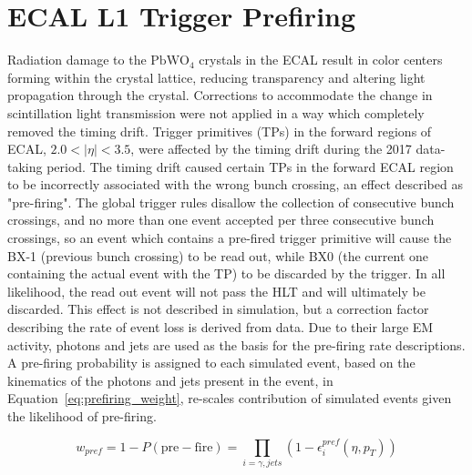 \section{ECAL L1 Trigger Prefiring}\label{ch:prefire}
Radiation damage to the $\mathrm{PbWO_4}$ crystals in the ECAL result in color centers forming within the crystal lattice, reducing transparency and altering light propagation through the crystal. Corrections to accommodate the change in scintillation light transmission were not applied in a way which completely removed the timing drift. Trigger primitives (TPs) in the forward regions of ECAL, $2.0 < |\eta| < 3.5$, were affected by the timing drift during the 2017 data-taking period. The timing drift caused certain TPs in the forward ECAL region to be incorrectly associated with the wrong bunch crossing, an effect described as "pre-firing". The global trigger rules disallow the collection of consecutive bunch crossings, and no more than one event accepted per three consecutive bunch crossings, so an event which contains a pre-fired trigger primitive will cause the BX-1 (previous bunch crossing) to be read out, while BX0 (the current one containing the actual event with the TP) to be discarded by the trigger. In all likelihood, the read out event will not pass the HLT and will ultimately be discarded.
This effect is not described in simulation, but a correction factor describing the rate of event loss is derived from data. Due to their large EM activity, photons and jets are used as the basis for the pre-firing rate descriptions. A pre-firing probability is assigned to each simulated event, based on the kinematics of the photons and jets present in the event, in Equation~\ref{eq:prefiring_weight}, re-scales contribution of simulated events given the likelihood of pre-firing.

\begin{equation}
    w_{pref} = 1 - P(\mathrm{pre-fire}) = \prod_{i=\gamma,jets}{(1 - \epsilon_i^{pref}(\eta,p_T))}
    \label{eq:prefiring_weight}
\end{equation}
